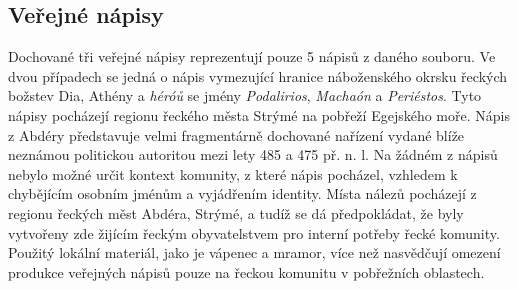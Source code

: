
\subsection[veřejné-nápisy-1]{Veřejné nápisy}

Dochované tři veřejné nápisy reprezentují pouze 5  nápisů z daného souboru. Ve dvou případech se jedná o nápis vymezující hranice náboženského okrsku řeckých božstev Dia, Athény a {\em héróů} se jmény {\em Podalirios}, {\em Machaón} a {\em Periéstos}. Tyto nápisy pocházejí regionu řeckého města Strýmé na pobřeží Egejského moře. Nápis z Abdéry představuje velmi fragmentárně dochované nařízení vydané blíže neznámou politickou autoritou mezi lety 485 a 475 př. n. l. Na žádném z nápisů nebylo možné určit kontext komunity, z které nápis pocházel, vzhledem k chybějícím osobním jménům a vyjádřením identity. Místa nálezů pocházejí z regionu řeckých měst Abdéra, Strýmé, a tudíž se dá předpokládat, že byly vytvořeny zde žijícím řeckým obyvatelstvem pro interní potřeby řecké komunity. Použitý lokální materiál, jako je vápenec a mramor, více než nasvědčují omezení produkce veřejných nápisů pouze na řeckou komunitu v pobřežních oblastech.

